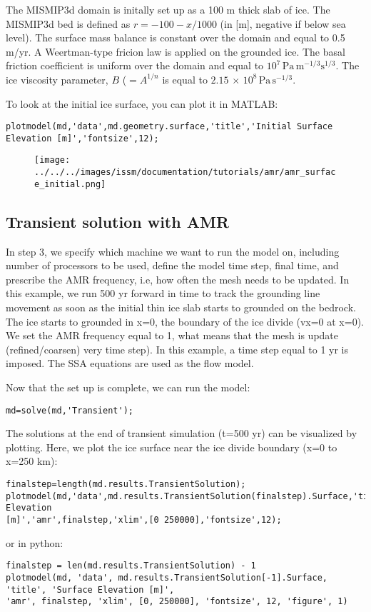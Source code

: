 The MISMIP3d domain is initally set up as a 100 m thick slab of ice. The MISMIP3d bed is defined as $r=-100-x/1000$ (in [m], negative if below sea level). The surface mass balance is constant over the domain and equal to 0.5 m/yr. A Weertman-type fricion law is applied on the grounded ice. The basal friction coefficient is uniform over the domain and equal to $10^{7}\,\textrm{Pa}\,\textrm{m}^{-1/3}\textrm{s}^{1/3}$. The ice viscosity parameter, $B$ ($=A^{1/n}$ is equal to $2.15 \, \times \, 10^{8}\,\textrm{Pa}\,\textrm{s}^{-1/3}$.

To look at the initial ice surface, you can plot it in MATLAB:
\begin{verbatim}plotmodel(md,'data',md.geometry.surface,'title','Initial Surface Elevation [m]','fontsize',12);\end{verbatim}

\begin{figure}[H]
	\begin{center}
		\texttt{[image: ../../../images/issm/documentation/tutorials/amr/amr\_surface\_initial.png]}
	\end{center}
\end{figure}

\subsection{Transient solution with AMR}
In step 3, we specify which machine we want to run the model on, including number of processors to be used, define the model time step, final time, and prescribe the AMR frequency, i.e, how often the mesh needs to be updated. In this example, we run 500 yr forward in time to track the grounding line movement as soon as the initial thin ice slab starts to grounded on the bedrock. The ice starts to grounded in x=0, the boundary of the ice divide (vx=0 at x=0). We set the AMR frequency equal to 1, what means that the mesh is update (refined/coarsen) very time step). In this example, a time step equal to 1 yr is imposed. The SSA equations are used as the flow model.

Now that the set up is complete, we can run the model:
\begin{verbatim}md=solve(md,'Transient');\end{verbatim}

The solutions at the end of transient simulation (t=500 yr) can be visualized by plotting. Here, we plot the ice surface near the ice divide boundary (x=0 to x=250 km):
\begin{verbatim}finalstep=length(md.results.TransientSolution);
plotmodel(md,'data',md.results.TransientSolution(finalstep).Surface,'title','Surface Elevation
[m]','amr',finalstep,'xlim',[0 250000],'fontsize',12);\end{verbatim}
or in python:
\begin{verbatim}finalstep = len(md.results.TransientSolution) - 1
plotmodel(md, 'data', md.results.TransientSolution[-1].Surface, 'title', 'Surface Elevation [m]',
'amr', finalstep, 'xlim', [0, 250000], 'fontsize', 12, 'figure', 1)\end{verbatim}

